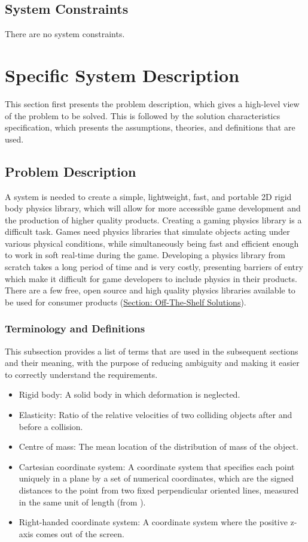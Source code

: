 \documentclass[12pt]{article}
\begin{document}
\subsection{System Constraints}
\label{Sec:SysConstraints}
There are no system constraints.
\section{Specific System Description}
\label{Sec:SpecSystDesc}
This section first presents the problem description, which gives a high-level view of the problem to be solved. This is followed by the solution characteristics specification, which presents the assumptions, theories, and definitions that are used.
\subsection{Problem Description}
\label{Sec:ProbDesc}
A system is needed to create a simple, lightweight, fast, and portable 2D rigid body physics library, which will allow for more accessible game development and the production of higher quality products. Creating a gaming physics library is a difficult task. Games need physics libraries that simulate objects acting under various physical conditions, while simultaneously being fast and efficient enough to work in soft real-time during the game. Developing a physics library from scratch takes a long period of time and is very costly, presenting barriers of entry which make it difficult for game developers to include physics in their products. There are a few free, open source and high quality physics libraries available to be used for consumer products (\hyperref[Sec:offShelfSolns]{Section: Off-The-Shelf Solutions}).
\subsubsection{Terminology and Definitions}
\label{Sec:TermDefs}
This subsection provides a list of terms that are used in the subsequent sections and their meaning, with the purpose of reducing ambiguity and making it easier to correctly understand the requirements.
\begin{itemize}
\item{Rigid body: A solid body in which deformation is neglected.}
\item{Elasticity: Ratio of the relative velocities of two colliding objects after and before a collision.}
\item{Centre of mass: The mean location of the distribution of mass of the object.}
\item{Cartesian coordinate system: A coordinate system that specifies each point uniquely in a plane by a set of numerical coordinates, which are the signed distances to the point from two fixed perpendicular oriented lines, measured in the same unit of length (from \cite{cartesianWiki}).}
\item{Right-handed coordinate system: A coordinate system where the positive z-axis comes out of the screen.}
\end{itemize}
\end{document}
